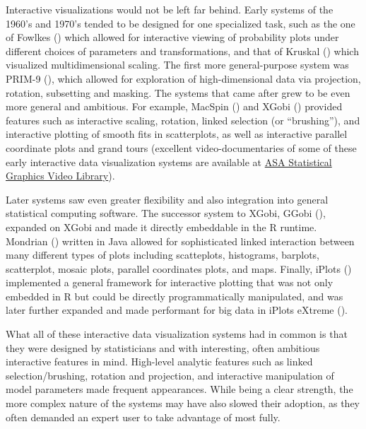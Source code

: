 \documentclass[
]{book}
\theoremstyle{definition}
\theoremstyle{definition}
\theoremstyle{definition}
\theoremstyle{definition}
\theoremstyle{remark}
\begin{document}
Interactive visualizations would not be left far behind. Early systems of the 1960's and 1970's tended to be designed for one specialized task, such as the one of Fowlkes () which allowed for interactive viewing of probability plots under different choices of parameters and transformations, and that of Kruskal () which visualized multidimensional scaling. The first more general-purpose system was PRIM-9 (), which allowed for exploration of high-dimensional data via projection, rotation, subsetting and masking. The systems that came after grew to be even more general and ambitious. For example, MacSpin () and XGobi () provided features such as interactive scaling, rotation, linked selection (or ``brushing''), and interactive plotting of smooth fits in scatterplots, as well as interactive parallel coordinate plots and grand tours (excellent video-documentaries of some of these early interactive data visualization systems are available at \href{https://community.amstat.org/jointscsg-section/media/videos}{ASA Statistical Graphics Video Library}).

Later systems saw even greater flexibility and also integration into general statistical computing software. The successor system to XGobi, GGobi (), expanded on XGobi and made it directly embeddable in the R runtime. Mondrian () written in Java allowed for sophisticated linked interaction between many different types of plots including scatteplots, histograms, barplots, scatterplot, mosaic plots, parallel coordinates plots, and maps. Finally, iPlots () implemented a general framework for interactive plotting that was not only embedded in R but could be directly programmatically manipulated, and was later further expanded and made performant for big data in iPlots eXtreme ().

What all of these interactive data visualization systems had in common is that they were designed by statisticians and with interesting, often ambitious interactive features in mind. High-level analytic features such as linked selection/brushing, rotation and projection, and interactive manipulation of model parameters made frequent appearances. While being a clear strength, the more complex nature of the systems may have also slowed their adoption, as they often demanded an expert user to take advantage of most fully.
\end{document}
